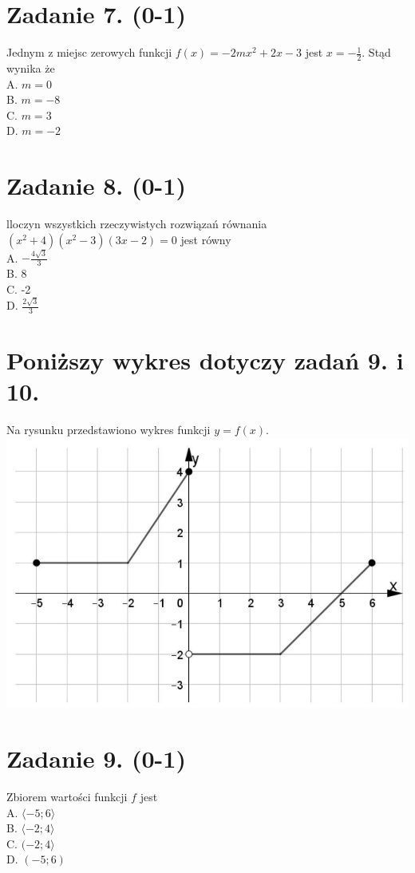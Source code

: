 \documentclass[10pt]{article}
\begin{document}
\section*{Zadanie 7. (0-1)}
Jednym z miejsc zerowych funkcji \(f(x)=-2 m x^{2}+2 x-3\) jest \(x=-\frac{1}{2}\). Stąd wynika że\\
A. \(m=0\)\\
B. \(m=-8\)\\
C. \(m=3\)\\
D. \(m=-2\)

\section*{Zadanie 8. (0-1)}
lloczyn wszystkich rzeczywistych rozwiązań równania \(\left(x^{2}+4\right)\left(x^{2}-3\right)(3 x-2)=0\) jest równy\\
A. \(-\frac{4 \sqrt{3}}{3}\)\\
B. 8\\
C. -2\\
D. \(\frac{2 \sqrt{3}}{3}\)

\section*{Poniższy wykres dotyczy zadań 9. i 10.}
Na rysunku przedstawiono wykres funkcji \(y=f(x)\).\\
\includegraphics[max width=\textwidth, center]{2024_11_21_ba65d61981011633d840g-04}

\section*{Zadanie 9. (0-1)}
Zbiorem wartości funkcji \(f\) jest\\
A. \(\langle-5 ; 6\rangle\)\\
B. \(\langle-2 ; 4\rangle\)\\
C. \((-2 ; 4\rangle\)\\
D. \((-5 ; 6)\)
\end{document}
